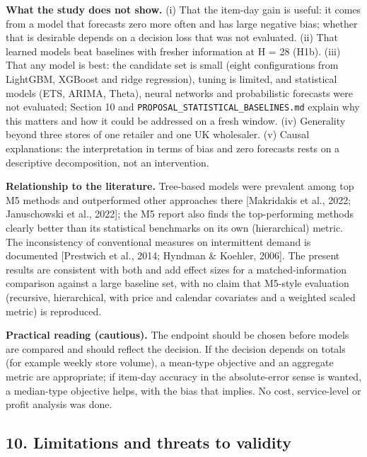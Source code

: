 \documentclass[
]{article}
\begin{document}
\textbf{What the study does not show.} (i) That the item-day gain is
useful: it comes from a model that forecasts zero more often and has
large negative bias; whether that is desirable depends on a decision
loss that was not evaluated. (ii) That learned models beat baselines
with fresher information at H = 28 (H1b). (iii) That any model is best:
the candidate set is small (eight configurations from LightGBM, XGBoost
and ridge regression), tuning is limited, and statistical models (ETS,
ARIMA, Theta), neural networks and probabilistic forecasts were not
evaluated; Section 10 and \texttt{PROPOSAL\_STATISTICAL\_BASELINES.md}
explain why this matters and how it could be addressed on a fresh
window. (iv) Generality beyond three stores of one retailer and one UK
wholesaler. (v) Causal explanations: the interpretation in terms of bias
and zero forecasts rests on a descriptive decomposition, not an
intervention.

\textbf{Relationship to the literature.} Tree-based models were
prevalent among top M5 methods and outperformed other approaches there
{[}Makridakis et al., 2022; Januschowski et al., 2022{]}; the M5 report
also finds the top-performing methods clearly better than its
statistical benchmarks on its own (hierarchical) metric. The
inconsistency of conventional measures on intermittent demand is
documented {[}Prestwich et al., 2014; Hyndman \& Koehler, 2006{]}. The
present results are consistent with both and add effect sizes for a
matched-information comparison against a large baseline set, with no
claim that M5-style evaluation (recursive, hierarchical, with price and
calendar covariates and a weighted scaled metric) is reproduced.

\textbf{Practical reading (cautious).} The endpoint should be chosen
before models are compared and should reflect the decision. If the
decision depends on totals (for example weekly store volume), a
mean-type objective and an aggregate metric are appropriate; if item-day
accuracy in the absolute-error sense is wanted, a median-type objective
helps, with the bias that implies. No cost, service-level or profit
analysis was done.

\subsection{10. Limitations and threats to
validity}\label{limitations-and-threats-to-validity}
\end{document}
